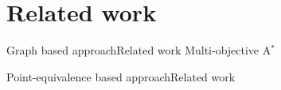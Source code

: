 \section{Related work}

\begin{frame}{Graph based approach}{Related work}
Multi-objective A$ ^{*}$
\end{frame}

\begin{frame}{Point-equivalence based approach}{Related work}
\end{frame}

